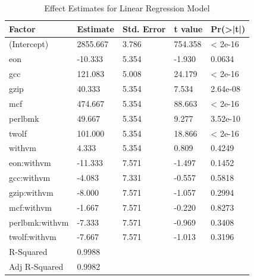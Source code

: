 \documentclass[preprint]{sigplanconf}
\begin{document}
\begin{table}
  \centering
  \begin{tabular}{l|l|l|l|l}
     Factor&Estimate&Std. Error&t value&Pr(>|t|)    \\
     \hline
     (Intercept)&2855.667&3.786&754.358 &< 2e-16\\
     eon&-10.333&5.354&-1.930& 0.0634 \\
     gcc&121.083&5.008&24.179& < 2e-16\\
     gzip&40.333&5.354&7.534&2.64e-08 \\
     mcf&474.667&5.354& 88.663 & < 2e-16\\ 
     perlbmk&49.667&5.354&   9.277& 3.52e-10 \\
     twolf&101.000& 5.354&  18.866&  < 2e-16 \\
     withvm&4.333& 5.354&  0.809&   0.4249 \\
     eon:withvm&-11.333&7.571&  -1.497&   0.1452    \\
     gcc:withvm&-4.083&7.331&  -0.557&   0.5818    \\
     gzip:withvm&-8.000&7.571&  -1.057&   0.2994   \\
     mcf:withvm&-1.667&7.571&  -0.220&   0.8273    \\
     perlbmk:withvm&-7.333&7.571&  -0.969&   0.3408  \\  
     twolf:withvm&-7.667&7.571&  -1.013&   0.3196    \\
     \hline
     R-Squared&0.9988&&&\\
     Adj R-Squared&0.9982&&&\\
   \end{tabular}
   \caption{Effect Estimates for Linear Regression Model}
   \label{tab:SingleModelFit}
 \end{table}
\end{document}
